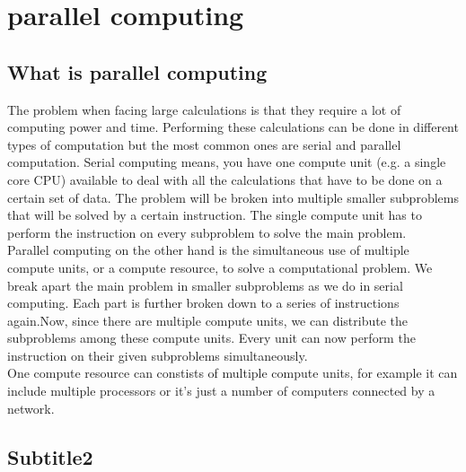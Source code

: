 \documentclass[a4paper, 11pt]{report}
\begin{document}
\section{parallel computing}

\subsection{What is parallel computing}
The problem when facing large calculations is that they require a lot of computing power and time. Performing these calculations can be done in different types of computation but the most common ones are serial and parallel computation. Serial computing means, you have one compute unit (e.g. a single core CPU) available to deal with all the calculations that have to be done on a certain set of data. The problem will be broken into multiple smaller subproblems that will be solved by a certain instruction. The single compute unit has to perform the instruction on every subproblem to solve the main problem.\\ Parallel computing on the other hand is the simultaneous use of multiple compute units, or a compute resource, to solve a computational problem. We break apart the main problem in smaller subproblems as we do in serial computing. Each part is further broken down to a series of instructions again.Now, since there are multiple compute units, we can distribute the subproblems among these compute units. Every unit can now perform the instruction on their given subproblems simultaneously.\\
One compute resource can constists of multiple compute units, for example it can include multiple processors or it's just a number of computers connected by a network.

\subsection{Subtitle2}



\end{document}
